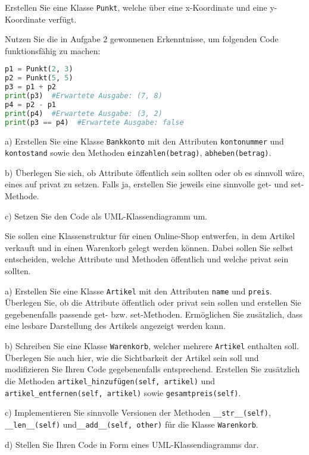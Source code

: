 \documentclass[11pt, a4paper, oneside]{article}
\begin{document}
	
	
	Erstellen Sie eine Klasse \texttt{Punkt}, welche über eine x-Koordinate und eine y-Koordinate verfügt.
	
	Nutzen Sie die in Aufgabe 2 gewonnenen Erkenntnisse, um folgenden Code funktionsfähig zu machen:
	
	\begin{lstlisting}[language=python]
p1 = Punkt(2, 3)
p2 = Punkt(5, 5)
p3 = p1 + p2
print(p3)  #Erwartete Ausgabe: (7, 8)
p4 = p2 - p1
print(p4)  #Erwartete Ausgabe: (3, 2)
print(p3 == p4)  #Erwartete Ausgabe: false
	\end{lstlisting}

	
	a) Erstellen Sie eine Klasse \texttt{Bankkonto} mit den Attributen \texttt{kontonummer} und \texttt{kontostand} sowie den Methoden \texttt{einzahlen(betrag)}, \texttt{abheben(betrag)}.
	
	b) Überlegen Sie sich, ob Attribute öffentlich sein sollten oder ob es sinnvoll wäre, eines auf privat zu setzen.
	Falls ja, erstellen Sie jeweils eine sinnvolle get- und set-Methode.
	
	c) Setzen Sie den Code als UML-Klassendiagramm um.
	
	
	Sie sollen eine Klassenstruktur für einen Online-Shop entwerfen, in dem Artikel verkauft und in einen Warenkorb gelegt werden können.
	Dabei sollen Sie selbst entscheiden, welche Attribute und Methoden öffentlich und welche privat sein sollten.
	
	a) Erstellen Sie eine Klasse \texttt{Artikel} mit den Attributen \texttt{name} und \texttt{preis}.
	Überlegen Sie, ob die Attribute öffentlich oder privat sein sollen und erstellen Sie gegebenenfalls passende get- bzw. set-Methoden.
	Ermöglichen Sie zusätzlich, dass eine lesbare Darstellung des Artikels angezeigt werden kann.
	
	b) Schreiben Sie eine Klasse \texttt{Warenkorb}, welcher mehrere \texttt{Artikel} enthalten soll.
	Überlegen Sie auch hier, wie die Sichtbarkeit der Artikel sein soll und modifizieren Sie Ihren Code gegebenenfalls entsprechend.
	Erstellen Sie zusätzlich die Methoden \texttt{artikel\_hinzufügen(self, artikel)} und \texttt{artikel\_entfernen(self, artikel)} sowie \texttt{gesamtpreis(self)}.
	
	c) Implementieren Sie sinnvolle Versionen der Methoden \texttt{\_\_str\_\_(self)}, \texttt{\_\_len\_\_(self)} und\linebreak \texttt{\_\_add\_\_(self, other)} für die Klasse \texttt{Warenkorb}.
	
	d) Stellen Sie Ihren Code in Form eines UML-Klassendiagramms dar.
	
\end{document}

